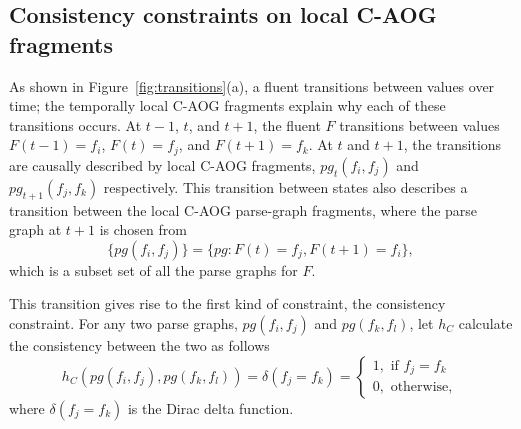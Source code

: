 \documentclass[10pt,journal,letterpaper,compsoc]{IEEEtran}
\begin{document}
\subsection{Consistency constraints on local C-AOG fragments}




As shown in Figure~\ref{fig:transitions}(a), a fluent transitions between values over time; the temporally local C-AOG fragments explain why each of these transitions occurs.  At $t-1$, $t$, and $t+1$, the fluent $F$ transitions between values $F(t-1) = f_i$, $F(t) = f_j$,  and $F(t+1) = f_k$.  At $t$ and $t+1$, the transitions are causally described by local C-AOG fragments, $pg_t (f_i, f_j)$ and $pg_{t+1} (f_j, f_k)$ respectively.  This transition between states also describes a transition between the local C-AOG parse-graph fragments, where the parse graph at $t+1$ is chosen from 
\begin{equation}
 \{pg (f_i, f_j) \} = \{pg : F(t) = f_j, F(t+1) = f_{i} \}, 
\end{equation}
which is a subset set of all the parse graphs for $F$. 


This transition gives rise to the first kind of constraint, the consistency constraint.  For any two parse graphs, $pg (f_i, f_j)$ and $pg(f_k, f_l)$, let $h_{C}$ calculate the consistency between the two as follows
\begin{equation}
h_{C} \left( pg (f_i, f_j), pg(f_k, f_l) \right) = \delta \left( f_j = f_k \right)  = \begin{cases} 1, \textrm{ if } f_j = f_k \\ 0 , \textrm{ otherwise}, \end{cases}  
\end{equation}
where $\delta \left( f_j = f_k \right)$ is the Dirac delta function.
\end{document}
